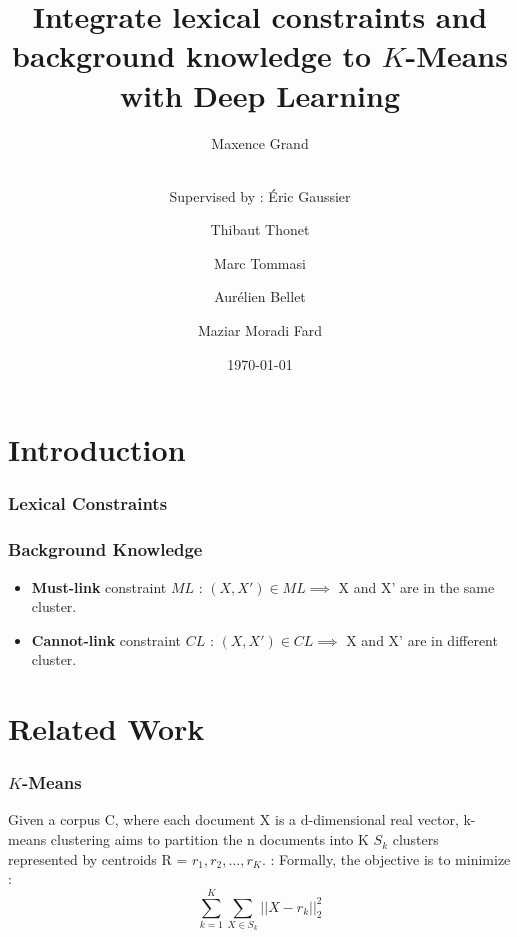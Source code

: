 \documentclass{beamer}
\begin{document}
\title{Integrate lexical constraints and background knowledge to $K$-Means with Deep Learning}
\author{Maxence Grand \and \\                                                   
        Supervised by : \'Eric Gaussier \and Thibaut Thonet \and Marc Tommasi \and Aur\'elien Bellet \and Maziar Moradi Fard} 
\date{\today}

\maketitle

\section{Introduction}

\begin{frame}
\frametitle{Lexical Constraints}

\end{frame}

\begin{frame}
\frametitle{Background Knowledge}
\begin{itemize}
\item \textbf{Must-link} constraint $ML$ : $(X, X') \in ML \implies $ X and X' are in the
  same cluster.
\item \textbf{Cannot-link} constraint $CL$ : $(X, X') \in CL \implies $ X and X' are in
  different cluster.
\end{itemize}
\end{frame}

\section{Related Work}

\begin{frame}
\frametitle{$K$-Means}
Given a corpus C, where each document X is a 
d-dimensional real vector, k-means clustering aims to partition the n 
documents into K $S_k$ clusters represented by centroids 
R = {$r_1, r_2, ..., r_K$}. :
Formally, the objective is to minimize :
$$
\sum_{k =1 }^K \sum_{X \in S_k} ||X - r_k||_2^2
$$
\end{frame}
\end{document}
